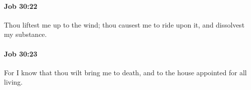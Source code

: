 		\paragraph{Job 30:22} %
			\label{JOB-30-22}

			Thou liftest me up to the wind; thou causest me to ride upon it, and dissolvest my substance.


		\paragraph{Job 30:23} %
			\label{JOB-30-23}

			For I know that thou wilt bring me to death, and to the house appointed for all living.


